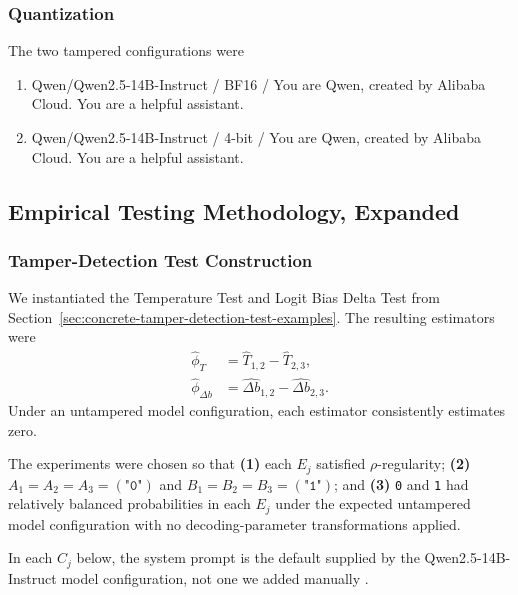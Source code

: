 \documentclass{article}
\begin{document}
\subsubsection{Quantization}
\label{app:proof-of-concept-configurations-quantization}

The two tampered configurations were
\begin{enumerate}
  \item {\small\ttfamily Qwen/Qwen2.5-14B-Instruct / BF16 / You
  are Qwen, created by Alibaba Cloud. You are a helpful assistant.}
  \item {\small\ttfamily Qwen/Qwen2.5-14B-Instruct / 4-bit / You are Qwen,
  created by Alibaba Cloud. You are a helpful assistant.}
\end{enumerate}

\subsection{Empirical Testing Methodology, Expanded}
\label{app:proof-of-concept-methodology}

\subsubsection{Tamper-Detection Test Construction}
We instantiated the Temperature Test and Logit Bias Delta Test from
Section~\ref{sec:concrete-tamper-detection-test-examples}. The resulting
estimators were
\begin{align*}
\widehat{\phi}_{T}
&=\widehat{T}_{1,2}-\widehat{T}_{2,3},\\
\widehat{\phi}_{\Delta b}
&=\widehat{\Delta b}_{1,2}-\widehat{\Delta b}_{2,3}.
\end{align*}
Under an untampered model configuration, each estimator consistently estimates
zero.

The experiments were chosen so that \textbf{(1)} each $E_j$ satisfied
$\rho$-regularity; \textbf{(2)}
$A_1=A_2=A_3=(\texttt{"0"})$ and
$B_1=B_2=B_3=(\texttt{"1"})$; and \textbf{(3)} \texttt{0} and \texttt{1}
had relatively balanced probabilities in each $E_j$ under the expected
untampered model configuration with no decoding-parameter transformations
applied.

In each $C_j$ below, the system prompt is the default supplied by the
Qwen2.5-14B-Instruct model configuration, not one we added manually
\citep{qwen25_14b_instruct_hf}.
\end{document}
